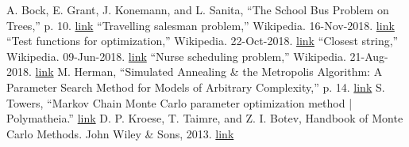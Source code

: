 \documentclass[conference]{IEEEtran}
\begin{document}
\begin{thebibliography}{00}
 A. Bock, E. Grant, J. Konemann, and L. Sanita, “The School Bus Problem on Trees,” p. 10. \href{https://www.math.uwaterloo.ca/~jochen/docs/sbp.pdf}{link}
 “Travelling salesman problem,” Wikipedia. 16-Nov-2018. \href{https://en.wikipedia.org/w/index.php?title=Travelling_salesman_problem&oldid=869096463}{link}
 “Test functions for optimization,” Wikipedia. 22-Oct-2018. \href{https://en.wikipedia.org/wiki/Test_functions_for_optimization}{link}
 “Closest string,” Wikipedia. 09-Jun-2018. \href{https://en.wikipedia.org/wiki/Closest_string}{link}
 “Nurse scheduling problem,” Wikipedia. 21-Aug-2018. \href{https://en.wikipedia.org/wiki/Nurse_scheduling_problem}{link}
 M. Herman, “Simulated Annealing \& the Metropolis Algorithm: A Parameter Search Method for Models of Arbitrary Complexity,” p. 14. \href{https://pdfs.semanticscholar.org/3eea/67240fb0c2ec4f9ed5c61706c51dc770e102.pdf}{link}
 S. Towers, “Markov Chain Monte Carlo parameter optimization method | Polymatheia.” \href{http://sherrytowers.com/2014/07/15/markov-chain-monte-carlo-parameter-optimization-method/}{link}
 D. P. Kroese, T. Taimre, and Z. I. Botev, Handbook of Monte Carlo Methods. John Wiley \& Sons, 2013. \href{https://books.google.com/books?hl=en&lr=&id=Trj9HQ7G8TUC&oi=fnd&pg=PA1&ots=1EUdKeX7EE&sig=KU85plZUZghrbRSwrvlxZc6MHIg#v=onepage&q=441&f=false}{link}
\end{thebibliography}
\end{document}
